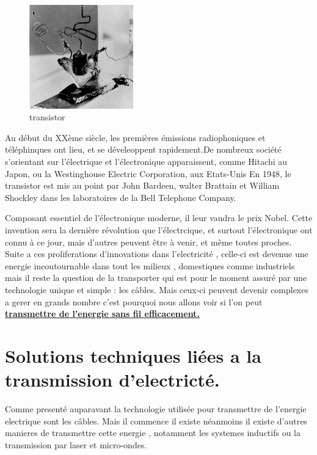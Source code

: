 \documentclass[12pt]{report}
\begin{document}
\begin{figure}
  \begin{center}
    \includegraphics[width=0.4\textwidth]{transistor}
  \end{center}
  \caption{transistor}
\end{figure} Au début du XXème siècle, les premières émissions radiophoniques et téléphinques ont lieu, et se déveleoppent rapidement.De nombreux société s'orientant sur l'électrique et l'électronique apparaissent, comme Hitachi au Japon, ou la Westinghouse Electric Corporation, aux Etats-Unis
En 1948, le transistor est mis au point par John Bardeen, walter Brattain et William Shockley dans les laboratoires de la Bell Telephone Company. 

Composant essentiel de l'électronique moderne, il leur vaudra le prix Nobel.
Cette invention sera la dernière révolution que l'électrcique, et surtout l'électronique ont connu à ce jour, mais d'autres peuvent être à venir, et même toutes proches. Suite a ces proliferations d'innovations dans l'electricité , celle-ci est devenue une energie incoutournable dans tout les milieux , domestiques comme industriels mais il reste la question de la transporter qui est pour le moment assuré par une technologie unique et simple : les câbles. Mais ceux-ci peuvent devenir complexes a gerer en grands nombre c'est pourquoi nous allons voir si l'on peut \textbf{\underline{transmettre de l'energie sans fil efficacement.}}

\chapter{Solutions techniques liées a la transmission d'electricté.}
  Comme presenté auparavant la technologie utilisée pour transmettre de l'energie electrique sont les câbles. Mais il commence il existe néanmoins il existe d'autres manieres de transmettre cette energie , notamment les systemes inductifs ou la transmission par laser et micro-ondes.
  
\end{document}
